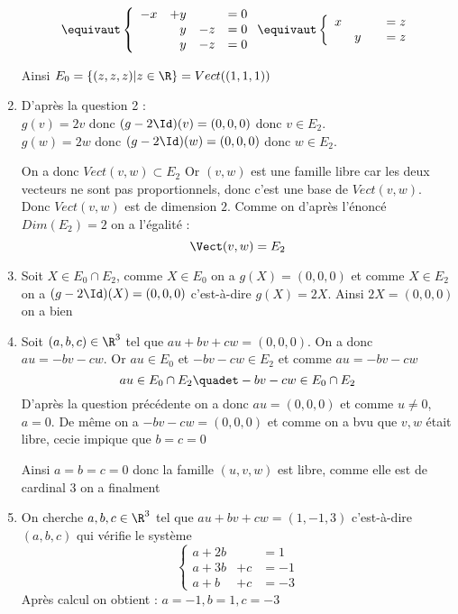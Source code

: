 \documentclass[a4paper, 11pt,reqno]{article}
\begin{document}
\begin{correction}
\begin{enumerate}
 
 $$\equivaut 
\left\{ 
\begin{array}{rrrc}
-x&+y& &=0\\
&y&-z&=0\\
&y&-z&=0
\end{array}
\right. 
\equivaut 
\left\{ 
\begin{array}{rrrc}
x& & &=z\\
&y& &=z
\end{array}
\right. 
 $$

Ainsi $E_0 = \{ (z,z,z) | z\in \R\} =Vect( (1,1,1))$



\item D'après la question 2 :\\
$g(v)=2v$ donc $(g-2\Id)(v)=(0,0,0)$ donc $v\in E_2$. \\
$g(w) =2w$ donc $(g-2\Id)(w)=(0,0,0)$ donc $w\in E_2$.

On a donc $Vect(v,w) \subset E_2$
Or $(v,w)$ est une famille libre car les deux vecteurs ne sont pas proportionnels, donc c'est une base de $Vect(v,w)$. Donc $Vect(v,w)$ est de dimension $2$. Comme on d'après l'énoncé $Dim(E_2)=2$ on a 
l'égalité : 
$$\Vect(v,w) =E_2$$



\item Soit $X\in E_0 \cap E_2$, comme $X\in E_0$ on a $g(X)=(0,0,0)$ et comme $X\in E_2$ on a $(g-2\Id)(X)=(0,0,0) $ c'est-à-dire $g(X) =2X$. 
Ainsi $2X= (0,0,0)$ on a bien 
 
\item Soit $(a,b,c)\in \R^3$ tel que $au+bv+cw=(0,0,0)$. On  a donc $au =-bv-cw$.
Or $au\in E_0$ et $-bv-cw\in E_2$ et comme $au=-bv-cw$ 
$$ au \in E_0 \cap E_2 \quadet -bv-cw\in E_0\cap E_2$$
D'après la question précédente on a donc $au =(0,0,0)$ et comme $u\neq 0$, $a=0$. De même on a 
$-bv-cw=(0,0,0)$ et comme on a bvu que $v,w$ était libre, cecie impique que $b=c=0$

Ainsi $a=b=c=0$ donc la famille $(u,v,w)$ est libre, comme elle est de cardinal 3  on a finalment 

\item On cherche $a,b,c\in \R^3$ tel que  $au+bv+cw= (1,-1,3)$ c'est-à-dire $(a,b,c)$ qui vérifie le système
$$\left\{ 
\begin{array}{ccc}
a+2b& &=1\\
a+3b&+c&=-1\\
a+b&+c&=-3
\end{array} \right.$$
Après calcul on obtient : $a=-1, b=1, c=-3$


\end{enumerate}
\end{correction}
\end{document}
